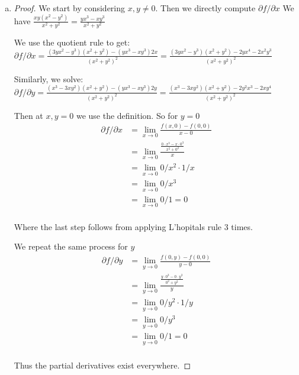 \documentclass[11pt]{article}
\begin{document}
\begin{enumerate}[(a)]
    \item 
    \begin{proof}
        We start by considering $x, y \neq 0$. Then we directly compute $\partial f / \partial x$
        We have $\frac{xy(x^2-y^2)}{x^2 + y^2} = \frac{yx^3-xy^3}{x^2 + y^2}$

        We use the quotient rule to get: 
        $\partial f / \partial x = \frac{(3yx^2 - y^3)(x^2 + y^2)  - (yx^3-xy^3)2x}{(x^2 + y^2)^2} = \frac{(3yx^2 - y^3)(x^2 + y^2) - 2yx^4-2x^2y^3}{(x^2 + y^2)^2}$

        Similarly, we solve: $\partial f / \partial y = \frac{(x^3 - 3xy^2)(x^2+ y^2) - (yx^3-xy^3)2y}{(x^2 + y^2)^2} = \frac{(x^3 - 3xy^2)(x^2 + y^2) - 2y^2x^3-2xy^4}{(x^2 + y^2)^2}$
        
        Then at $x, y = 0$ we use the definition. 
        So for $y = 0$
        \begin{align*}
            \partial f / \partial x &= \lim_{x \to 0} \frac{f(x,0) - f(0,0)}{x - 0}\\
            &= \lim_{x \to 0} \frac{\frac{0 \cdot x^3-x \cdot 0^3}{x^2 + 0^2}}{x} \\
            &= \lim_{x \to 0} 0/x^2 \cdot 1/x \\
            &= \lim_{x \to 0} 0/x^3 \\
            &=  \lim_{x \to 0} 0/1 = 0 \\
        \end{align*}
        
        Where the last step follows from applying L'hopitals rule 3 times.

        We repeat the same process for $y$
        \begin{align*}
            \partial f / \partial y &= \lim_{y \to 0} \frac{f(0,y) - f(0,0)}{y - 0}\\
            &= \lim_{y \to 0} \frac{\frac{y \cdot 0^3- 0 \cdot y^3}{0^2 + y^2}}{y} \\
            &= \lim_{y \to 0} 0/y^2 \cdot 1/y \\
            &= \lim_{y \to 0} 0/y^3 \\
            &=  \lim_{y \to 0} 0/1 = 0 \\
        \end{align*}

        Thus the partial derivatives exist everywhere.

    \end{proof}







\end{enumerate}
\end{document}
